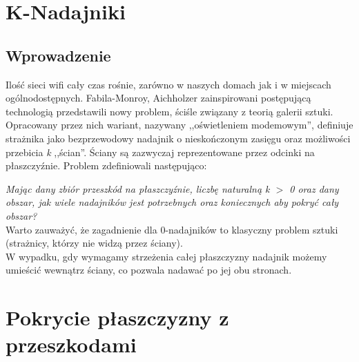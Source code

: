 \documentclass[brudnopis]{xmgr}
\begin{document}
\section{K-Nadajniki}
\subsection{Wprowadzenie}
Ilość sieci wifi cały czas rośnie, zarówno w naszych domach jak i w miejscach ogólnodostępnych. Fabila-Monroy, Aichholzer zainspirowani postępującą technologią przedstawili nowy problem, ściśle związany z teorią galerii sztuki. Opracowany przez nich wariant, nazywany ,,oświetleniem modemowym'', definiuje strażnika jako bezprzewodowy nadajnik o nieskończonym zasięgu oraz możliwości przebicia \textit{k} ,,ścian''. Ściany są zazwyczaj reprezentowane przez odcinki na płaszczyźnie. Problem zdefiniowali następująco:

\textit{
  Mając dany zbiór przeszkód na płaszczyźnie, liczbę naturalną k $>$ 0 oraz dany obszar, jak wiele  nadajników jest potrzebnych oraz koniecznych aby pokryć cały obszar?}  
\\\indent Warto zauważyć, że zagadnienie dla 0-nadajników to klasyczny problem sztuki (strażnicy, którzy nie widzą przez ściany).
\\W wypadku, gdy wymagamy strzeżenia całej płaszczyzny nadajnik możemy umieścić wewnątrz ściany, co pozwala nadawać po jej obu stronach.

\section{Pokrycie płaszczyzny z przeszkodami}
\end{document}
